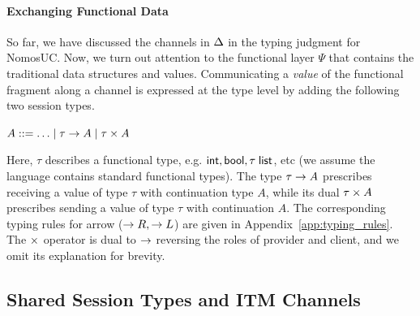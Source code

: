 
\paragraph*{\textbf{Exchanging Functional Data}}
So far, we have discussed the channels in $\Delta$ in the typing judgment for NomosUC.
Now, we turn out attention to the functional layer $\Psi$ that contains the
traditional data structures and values.
Communicating a \emph{value} of the functional fragment along a channel
is expressed at the type level by adding the following two session types.
\begin{center}
\begin{minipage}{0cm}
\begin{tabbing}
$A ::= \ldots \mid \tau \rightarrow A \mid \tau \times A$
\end{tabbing}
\end{minipage}
\end{center}
Here, $\tau$ describes a functional type, e.g. $\mathsf{int}, \mathsf{bool}, \tau \; \mathsf{list}$, etc
(we assume the language contains standard functional types).
The type $\tau \rightarrow A$ prescribes receiving a value of type $\tau$
with continuation type $A$, while its dual $\tau \times A$ prescribes
sending a value of type $\tau$ with continuation $A$. The corresponding
typing rules for arrow ($\rightarrow R, \rightarrow L$) are given in Appendix~\ref{app:typing_rules}.
The $\times$ operator is dual to $\rightarrow$ reversing the roles of provider and client,
and we omit its explanation for brevity.

\subsection{Shared Session Types and ITM Channels}
\label{subsec:communicators}

